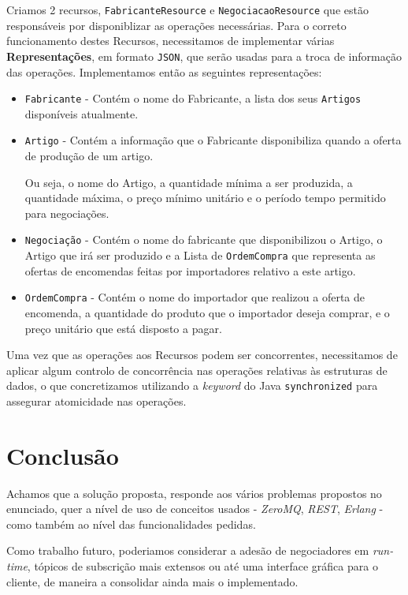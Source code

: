 \documentclass[12pt, a4paper]{report}
\begin{document}
Criamos 2 recursos, \texttt{FabricanteResource} e \texttt{NegociacaoResource} que estão responsáveis por disponiblizar as operações necessárias.
Para o correto funcionamento destes Recursos, necessitamos de implementar várias \textbf{Representações}, em formato \texttt{JSON}, que serão usadas para a troca de informação das operações.
Implementamos então as seguintes representações:
\begin{itemize}
    \item \texttt{Fabricante} - Contém o nome do Fabricante, a lista dos seus \texttt{Artigos} disponíveis atualmente.
    \item \texttt{Artigo} - Contém a informação que o Fabricante disponibiliza quando a oferta de produção de um artigo.
    
    Ou seja, o nome do Artigo, a quantidade mínima a ser produzida, a quantidade máxima, o preço mínimo unitário e o período tempo permitido para negociações.
    
    \item \texttt{Negociação} - Contém o nome do fabricante que disponibilizou o Artigo, o Artigo que irá ser produzido e a Lista de \texttt{OrdemCompra} que representa as ofertas de encomendas feitas por importadores relativo a este artigo.
    
    \item \texttt{OrdemCompra} - Contém o nome do importador que realizou a oferta de encomenda, a quantidade do produto que o importador deseja comprar, e o preço unitário que está disposto a pagar.
\end{itemize}

Uma vez que as operações aos Recursos podem ser concorrentes, necessitamos de aplicar algum controlo de concorrência nas operações relativas às estruturas de dados, o que concretizamos utilizando a \textit{keyword} do Java \texttt{synchronized} para assegurar atomicidade nas operações.


\chapter{Conclusão}

Achamos que a solução proposta, responde aos vários problemas propostos no
enunciado, quer a nível de uso de conceitos usados - \textit{ZeroMQ},
\textit{REST}, \textit{Erlang} - como também ao nível das funcionalidades
pedidas.


Como trabalho futuro, poderiamos considerar a adesão de negociadores em
\textit{run-time}, tópicos de subscrição mais extensos ou até uma interface
gráfica para o cliente, de maneira a consolidar ainda mais o implementado.
\end{document}
